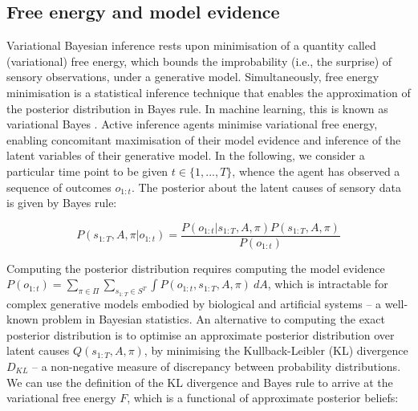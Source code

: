 \documentclass[review,12pt,authoryear]{elsarticle}
\begin{document}
\subsection{Free energy and model evidence}

Variational Bayesian inference rests upon minimisation of a quantity called (variational) free energy, which bounds the improbability (i.e., the surprise) of sensory observations, under a generative model. Simultaneously, free energy minimisation is a statistical inference technique that enables the approximation of the posterior distribution in Bayes rule. In machine learning, this is known as variational Bayes \citep{bishopPatternRecognitionMachine2006,jordanIntroductionVariationalMethods1998,bealVariationalAlgorithmsApproximate2003,bleiVariationalInferenceReview2017}. Active inference agents minimise variational free energy, enabling concomitant maximisation of their model evidence and inference of the latent variables of their generative model. In the following, we consider a particular time point to be given $t\in\{1,...,T\}$, whence the agent has observed a sequence of outcomes $o_{1:t}$. The posterior about the latent causes of sensory data is given by Bayes rule:
  	
  	\begin{equation}
  	\label{eq:bayes rule}
  	    P(s_{1:T}, A, \pi |o_{1:t})= \frac{P(o_{1:t} |s_{1:T}, A, \pi )P(s_{1:T}, A, \pi )}{P(o_{1:t})}
  	\end{equation}
  		
  		
Computing the posterior distribution requires computing the model evidence $P(o_{1:t})=\sum_{\pi \in \Pi }\sum_{s_{1:T}\in S^T}\int P(o_{1:t} ,s_{1:T}, A, \pi ) \: dA$, which is intractable for complex generative models embodied by biological and artificial systems \citep{fristonHierarchicalModelsBrain2008} -- a well-known problem in Bayesian statistics.
An alternative to computing the exact posterior distribution is to optimise an approximate posterior distribution over latent causes $Q(s_{1:T}, A, \pi)$, by minimising the Kullback-Leibler (KL) divergence \citep{kullbackInformationSufficiency1951} $D_{KL}$ -- a non-negative measure of discrepancy between probability distributions. We can use the definition of the KL divergence and Bayes rule to arrive at the variational free energy $F$, which is a functional of approximate posterior beliefs:
\end{document}
